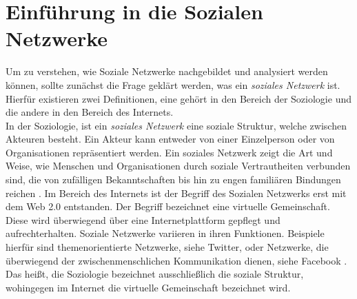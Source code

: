 \chapter{Einführung in die Sozialen Netzwerke}\label{ch:SNA}
Um zu verstehen, wie Soziale Netzwerke nachgebildet und analysiert werden können, sollte zunächst die Frage geklärt werden, was ein \textit{soziales Netzwerk} ist. Hierfür existieren zwei Definitionen, eine gehört in den Bereich der Soziologie und die andere in den Bereich des Internets. \\
In der Soziologie, ist ein \textit{soziales Netzwerk} eine soziale Struktur, welche zwischen Akteuren besteht. Ein Akteur kann entweder von einer Einzelperson oder  von Organisationen repräsentiert werden. Ein soziales Netzwerk zeigt die Art und Weise, wie Menschen und Organisationen durch soziale Vertrautheiten verbunden sind, die von zufälligen Bekanntschaften bis hin zu engen familiären Bindungen reichen \cite{SNADefinition}. Im Bereich des Internets ist der Begriff des Sozialen Netzwerks erst mit dem Web 2.0 entstanden. Der Begriff bezeichnet eine virtuelle Gemeinschaft. Diese wird überwiegend über eine Internetplattform gepflegt und aufrechterhalten. Soziale Netzwerke variieren in ihren Funktionen. Beispiele hierfür sind themenorientierte Netzwerke, siehe Twitter, oder Netzwerke, die überwiegend der zwischenmenschlichen Kommunikation dienen, siehe Facebook \cite{SNAWeb2.0}. Das heißt, die Soziologie bezeichnet ausschließlich die soziale Struktur, wohingegen im Internet die virtuelle Gemeinschaft bezeichnet wird.

